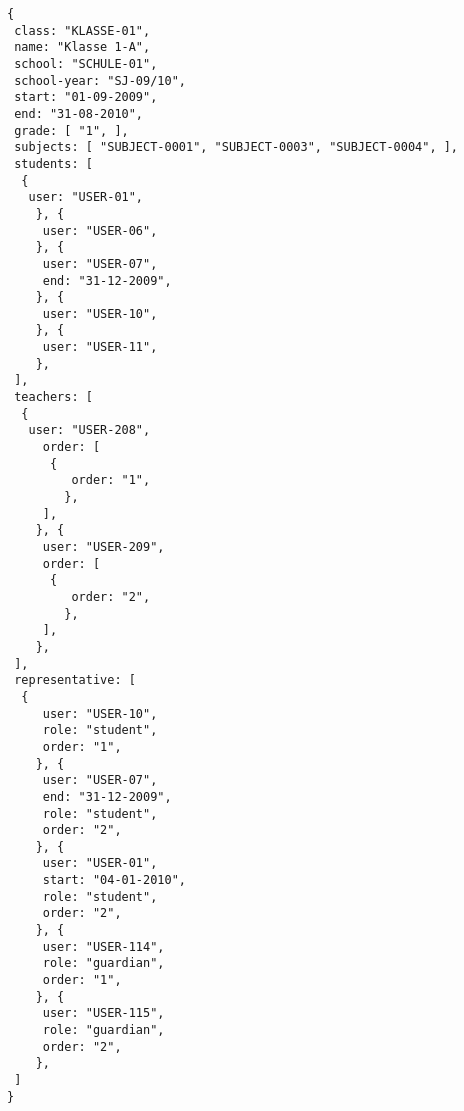 
\begin{lstlisting}[caption={Klassendatenmodel Beispiel 2: Grundschulklasse},frame=tlrb]
{
 class: "KLASSE-01",
 name: "Klasse 1-A",
 school: "SCHULE-01",
 school-year: "SJ-09/10",
 start: "01-09-2009",
 end: "31-08-2010",
 grade: [ "1", ],
 subjects: [ "SUBJECT-0001", "SUBJECT-0003", "SUBJECT-0004", ],
 students: [
  { 
   user: "USER-01",
	}, { 
	 user: "USER-06",
	}, { 
	 user: "USER-07",
	 end: "31-12-2009",
	}, { 
	 user: "USER-10",
	}, { 
	 user: "USER-11",
	},
 ],
 teachers: [
  { 
   user: "USER-208",
	 order: [
	  {
		 order: "1",
		},
	 ],
	}, { 
	 user: "USER-209",
	 order: [
	  {
		 order: "2",
		},
	 ],
	},
 ],
 representative: [
  {
	 user: "USER-10",
	 role: "student",
	 order: "1",	 
	}, {
	 user: "USER-07",
	 end: "31-12-2009",
	 role: "student",
	 order: "2",	 
	}, {
	 user: "USER-01",
	 start: "04-01-2010",
	 role: "student",
	 order: "2",	 
	}, {
	 user: "USER-114",
	 role: "guardian",
	 order: "1",	 
	}, {
	 user: "USER-115",
	 role: "guardian",
	 order: "2",	 
	},  
 ]
}
\end{lstlisting}